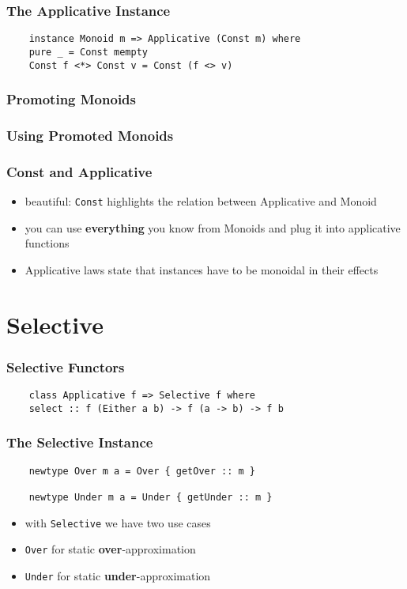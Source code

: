 \documentclass[aspectratio=169]{beamer}
\begin{document}
\begin{frame}[fragile]
  \frametitle{The Applicative Instance}
  \begin{verbatim}
    instance Monoid m => Applicative (Const m) where
    pure _ = Const mempty
    Const f <*> Const v = Const (f <> v)
  \end{verbatim}
\end{frame}

\begin{frame}
  \frametitle{Promoting Monoids}
\end{frame}

\begin{frame}
  \frametitle{Using Promoted Monoids}
\end{frame}

\begin{frame}
  \frametitle{Const and Applicative}
  \begin{itemize}
  \item beautiful: \texttt{Const} highlights the relation between
    Applicative and Monoid
  \item you can use \textbf{everything} you know from Monoids and plug it into applicative functions
  \item Applicative laws state that instances have to be monoidal in
    their effects
  \end{itemize}
\end{frame}

\section{Selective}

\begin{frame}[fragile]
  \frametitle{Selective Functors}
  \begin{verbatim}
    class Applicative f => Selective f where
    select :: f (Either a b) -> f (a -> b) -> f b
  \end{verbatim}
\end{frame}

\begin{frame}[fragile]
  \frametitle{The Selective Instance}
  \begin{verbatim}
    newtype Over m a = Over { getOver :: m }

    newtype Under m a = Under { getUnder :: m }
  \end{verbatim}
  \vfill
  \begin{itemize}
  \item with \texttt{Selective} we have two use cases
  \item \texttt{Over} for static \textbf{over}-approximation
  \item \texttt{Under} for static \textbf{under}-approximation
  \end{itemize}
\end{frame}
\end{document}
